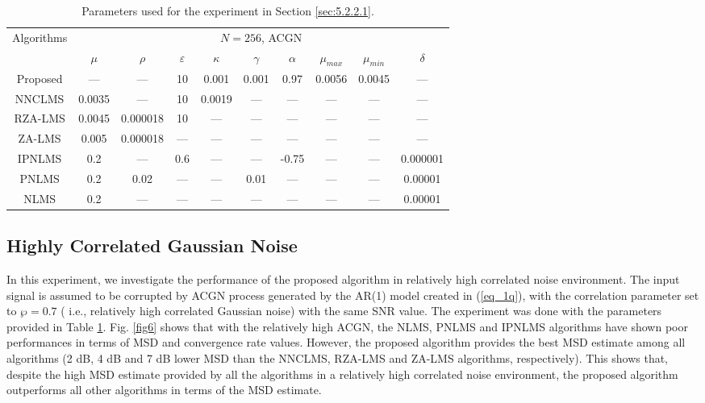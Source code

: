 \begin{table}[!htb]
\centering
\caption{Parameters used for the experiment in Section \ref{sec:5.2.2.1}.}
\vspace{0.5cm}
\begin{tabular}{|c|c|c|c|c|c|c|c|c|c|}
 \hline
    \multirow{2}{*}{Algorithms} & \multicolumn{9}{c|}{$N=256$, ACGN}\\
    \cline{2-10}
    & $\mu$ & $\rho$ & $\varepsilon$ & $\kappa$ & $\gamma$ &$\alpha$ & $\mu_{max}$ & $\mu_{min}$ & $\delta$ \\
    \hline
     Proposed  & --- & --- & 10 & 0.001 & 0.001& 0.97 & 0.0056 & 0.0045 & --- \\ \hline
     NNCLMS  &0.0035 & ---  & 10  & 0.0019 & --- & --- & --- & --- & ---  \\ \hline
   RZA-LMS & 0.0045 &0.000018 & 10 & --- & --- & --- & --- & --- & --- \\ \hline
   ZA-LMS  & 0.005 & 0.000018 & --- & --- & --- & --- & --- & --- & ---  \\ \hline
   IPNLMS & 0.2 & --- & 0.6 & --- & --- & -0.75 & --- & --- & 0.000001 \\ \hline
   PNLMS & 0.2 & 0.02 & --- & --- & 0.01 & --- & --- & --- & 0.00001  \\ \hline
   NLMS & 0.2 & --- & --- & --- & --- & --- & --- & --- &  0.00001  \\ \hline
\end{tabular}
\label{table3}
 \end{table}


\vspace{-0.3cm}
\subsection{Highly Correlated Gaussian Noise}\label{sec:5.2.2.2}
\vspace{-0.5cm}
\noindent In this experiment, we investigate the performance of the proposed algorithm in relatively high correlated noise environment. The input signal is assumed to be corrupted by ACGN process generated by the AR(1) model created in (\ref{eq_1q}), with the correlation parameter set to $\wp=0.7$ ( i.e., relatively high correlated Gaussian noise) with the same SNR value. The experiment was done with the parameters provided in Table \ref{table3}. Fig. \ref{fig6} shows that with the relatively high ACGN, the NLMS, PNLMS and IPNLMS algorithms have shown poor performances in terms of MSD and convergence rate values. However, the proposed algorithm provides the best MSD estimate among all algorithms (2 dB, 4 dB and 7 dB lower MSD than the NNCLMS, RZA-LMS and ZA-LMS algorithms, respectively). This shows that, despite the high MSD estimate provided by all the algorithms in a relatively high correlated noise environment, the proposed algorithm outperforms all other algorithms in terms of the MSD estimate.


